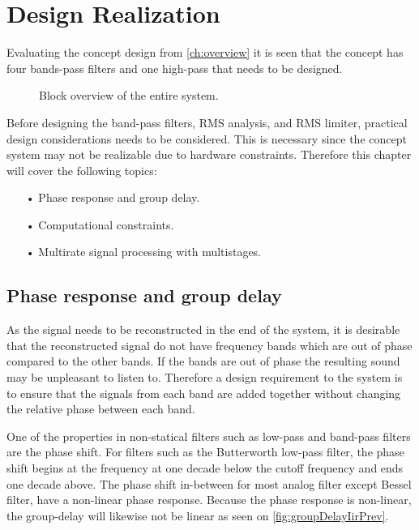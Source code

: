 \chapter{Design Realization} \label{ch:designRealization}
Evaluating the concept design from \autoref{ch:overview} it is seen that the concept has four bands-pass filters and one high-pass that needs to be designed. 
\begin{figure}[H]
\centering
{}
\scalebox{0.8}{
}
\caption{Block overview of the entire system.}
\label{fig:SystemOverview2}
\end{figure}
Before designing the band-pass filters, RMS analysis, and RMS limiter, practical design considerations needs to be considered. This is necessary since the concept system may not be realizable due to hardware constraints. Therefore this chapter will cover the following topics:
\begin{itemize}
\item[•] Phase response and group delay.
\item[•] Computational constraints.
\item[•] Multirate signal processing with multistages.
\end{itemize}


\section{Phase response and group delay}
As the signal needs to be reconstructed in the end of the system, it is desirable that the reconstructed signal do not have frequency bands which are out of phase compared to the other bands. If the bands are out of phase the resulting sound may be unpleasant to listen to. Therefore a design requirement to the system is to ensure that the signals from each band are added together without changing the relative phase between each band.

One of the properties in non-statical filters such as low-pass and band-pass filters are the phase shift. For filters such as the Butterworth low-pass filter, the phase shift begins at the frequency at one decade below the cutoff frequency and ends one decade above. The phase shift in-between for most analog filter except Bessel filter, have a non-linear phase response. Because the phase response is non-linear, the group-delay will likewise not be linear as seen on \autoref{fig:groupDelayIirPrev}.

